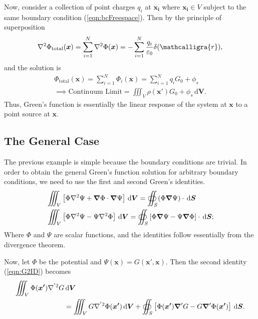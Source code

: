 \documentclass[12pt,english]{article}
\newcommand{\dmr}[1]{\, \mathrm{d}#1} %
\newcommand{\curly}[1]{\ensuremath{\mathcalligra{#1}}}
\renewcommand{\vec}[1]{\boldsymbol{#1}}
\begin{document}
Now, consider a collection of point charges $q_i$ at $\vec{x_i}$ where $\vec{x_i} \in V$ subject to the same boundary condition (\ref{eqn:bcFreespace}). Then by the principle of superposition 
\begin{equation}
    \laplacian \Phi_{\text{total}}(\vec{x}) = \sum_{i = 1}^{N}\laplacian\Phi(\vec{x}) = - \sum_{i = 1}^{N} \frac{q_i}{\varepsilon_0} \delta(\curly{r}),
\end{equation}
and the solution is 
\begin{subequations}
    \begin{align}
        \Phi_{\text{total}}(\vec{x}) = \sum_{i = 1}^{N} \Phi_i(\vec{x}) = \sum_{i = 1}^{N} q_i G_0 + \phi_s\\ 
        \implies \text{Continuum Limit} = \iiint_{V} \rho(\vec{x'}) G_0 + \phi_s \dmr{\vec{V}}.
    \end{align}
\end{subequations}
Thus, Green's function is essentially the linear response of the system at $\vec{x}$ to a point source at $\vec{x}$.


\subsection{The General Case}
The previous example is simple because the boundary conditions are trivial. In order to obtain the general Green's function solution for arbitrary boundary conditions, we need to use the first and second Green's identities.
\begin{subequations}
    \begin{align}
        &\iiint_{V}\left[\Phi\laplacian\Psi + \grad\Phi \cdot \grad\Psi\right] \dmr{\vec{V}} = \oiint_S (\Phi\grad\Psi)\cdot\dmr{\vec{S}} \label{eqn:G1ID}\\
        &\iiint_{V}\left[\Phi\laplacian\Psi - \Psi\laplacian\Phi\right] \dmr{\vec{V}} = \oiint_S \left[ \Phi\grad\Psi - \Psi\grad\Phi \right] \cdot \dmr{\vec{S}}; \label{eqn:G2ID}
    \end{align}
\end{subequations}
Where $\Phi$ and $\Psi$ are scalar functions, and the identities follow essentially from the divergence theorem. 

Now, let $\Phi$ be the potential and $\Psi(\vec{x}) = G(\vec{x'}, \vec{x})$. Then the second identity (\ref{eqn:G2ID}) becomes
\begin{equation}
    \begin{split}
        \iiint_{V} \Phi(\vec{x'}) \nabla^{'2} G &\dmr{\vec{V}} \\
        &= \iiint_{V} G \nabla^{'2} \Phi(\vec{x'}) \dmr{\vec{V}} + \oiint_S \left[ \Phi(\vec{x'}) \grad' G - G\grad'\Phi(\vec{x'})  \right] \dmr{\vec{S}}.
    \end{split}
\end{equation}
\end{document}
